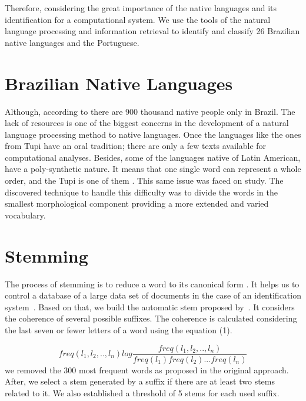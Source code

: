 \documentclass[12pt]{article}
\begin{document}
Therefore, considering the great importance of the native languages and its identification for a computational system.
We use the tools of the natural language processing and information retrieval to identify and classify 26 Brazilian native languages and the Portuguese.

\section{Brazilian Native Languages} \label{sec:firstpage}
  
  Although, according to \cite{povos_indigenas} there are 900 thousand native people only in Brazil.
  The lack of resources is one of the biggest concerns in the development of a natural language processing method to native languages.
  Once the languages like the ones from Tupi have an oral tradition;
  there are only a few texts available for computational analyses.
  Besides, some of the languages native of Latin American, have a poly-synthetic nature.
  It means that one single word can represent a whole order, and the Tupi is one of them \cite{lemos1956tupi}.
  This same issue was faced on \cite{DBLP:journals/corr/abs-1804-06024} study.
  The discovered technique to handle this difficulty was to divide the words in the smallest morphological component providing a more extended and varied vocabulary.


\section{Stemming}\label{sec:stemming}

The process of stemming is to reduce a word to its canonical form \cite{Goldsmith:2000:ALS:648263.753378}.
It helps us to control a database of a large data set of documents in the case of an identification
system~\cite{Goldsmith:2000:ALS:648263.753378}.
Based on that, we build the automatic stem proposed by~\cite{Goldsmith:2000:ALS:648263.753378}.
It considers the coherence of several possible suffixes.
The coherence is calculated considering the last seven or fewer letters of a word using the equation (1).

\begin{equation}
    freq(l_1,l_2,..,l_n)log\frac{freq(l_1,l_2,..,l_n)}{freq(l_1)freq(l_2)...freq(l_n)}
\end{equation}
we removed the 300 most frequent words as proposed in the original approach.
After, we select a stem generated by a suffix if there are at least two stems related to it.
We also established a threshold of 5 stems for each used suffix.
\end{document}
